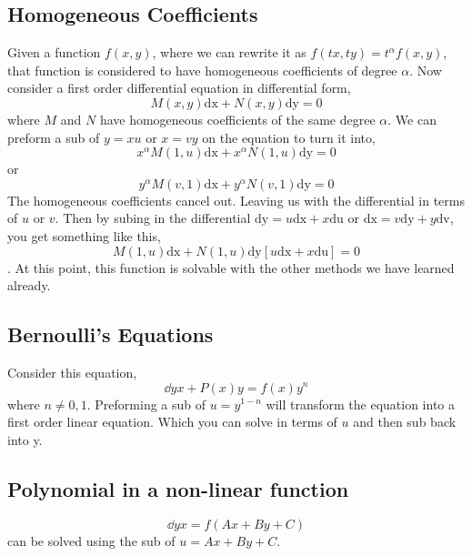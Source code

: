 \subsection{Homogeneous Coefficients}
Given a function $f(x,y)$, where we can rewrite it as $f(tx,ty) = t^\alpha f(x,y)$, that function is considered to have homogeneous coefficients of degree $\alpha$. Now consider a first order differential equation in differential form, 
\begin{equation*}
	M(x,y)\mathrm{dx} + N(x,y)\mathrm{dy} = 0  
\end{equation*}
where $M$ and $N$ have homogeneous coefficients of the same degree $\alpha$. We can preform a sub of $y=xu$ or $x=vy$ on the equation to turn it into, 
\begin{equation*}
	x^\alpha M(1,u) \mathrm{dx} + x^\alpha N(1,u)\mathrm{dy} = 0
\end{equation*} 
or 
\begin{equation*}
y^\alpha M(v,1) \mathrm{dx} + y^\alpha N(v,1)\mathrm{dy} = 0
\end{equation*}
The homogeneous coefficients cancel out. Leaving us with the differential in terms of $u$ or $v$.
Then by subing in the differential $\mathrm{dy} = u\mathrm{dx} + x\mathrm{du}$ or $\mathrm{dx} = v\mathrm{dy} + y\mathrm{dv}$, you get something like this,
\begin{equation*}
	M(1,u) \mathrm{dx} + N(1,u)\mathrm{dy}[u\mathrm{dx} + x\mathrm{du}] = 0 
\end{equation*}.
At this point, this function is solvable with the other methods we have learned already.
\subsection{Bernoulli's Equations}
Consider this equation, 
\begin{equation*}
	\dd{y}{x} + P(x)y= f(x)y^n
\end{equation*} 
where $n \neq 0,1$. Preforming a sub of $u=y^{1-n}$ will transform the equation into a first order linear equation. Which you can solve in terms of $u$ and then sub back into y. 
\subsection{Polynomial in a non-linear function}
\begin{equation*}
	\dd{y}{x} = f(Ax + By + C)
\end{equation*} 
can be solved using the sub of $u=Ax + By + C$.